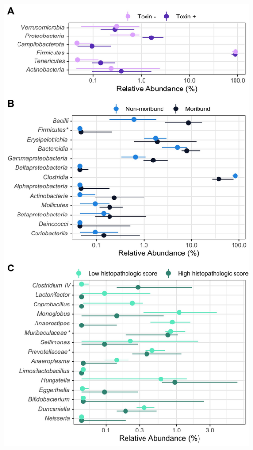 \documentclass[
  12pt,
]{article}
\begin{document}
\hfill\break

\includegraphics{../results/figures/figure_5.jpg}
\end{document}
